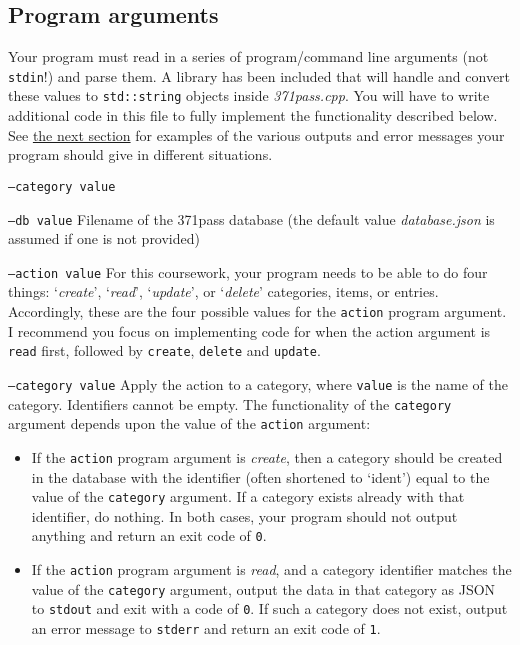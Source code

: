 \documentclass[a4paper]{article}
\begin{document}
\subsection*{Program arguments}\label{sec:cwk args}
Your program must read in a series of program/command line arguments (not \texttt{stdin}!) and parse them. A library has been included that will handle and convert these values to \texttt{std::string} objects inside \emph{371pass.cpp}. You will have to write additional code in this file to fully implement the functionality described below. See \hyperref[sec:cwk outputs]{the next section} for examples of the various outputs and error messages your program should give in different situations. 

\begin{labeling}{ \texttt{--category value} }
    \item[\texttt{--db value}]
    Filename of the 371pass database (the default value \emph{database.json} is assumed if one is not provided)

    \item[\texttt{--action value}]
    For this coursework, your program needs to be able to do four things: `\emph{create}', `\emph{read}', `\emph{update}', or `\emph{delete}' categories, items, or entries. Accordingly, these are the four possible values for the \texttt{action} program argument. I recommend you focus on implementing code for when the action argument is \texttt{read} first, followed by \texttt{create}, \texttt{delete} and \texttt{update}.

    \item[\texttt{--category value}]
    Apply the action to a category, where \texttt{value} is the name of the category. Identifiers cannot be empty. The functionality of the \texttt{category} argument depends upon the value of the \texttt{action} argument:
        \begin{itemize}
    
        \item If the \texttt{action} program argument is \emph{create}, then a category should be created in the database with the identifier (often shortened to `ident') equal to the value of the \texttt{category} argument. If a category exists already with that identifier, do nothing. In both cases, your program should not output anything and return an exit code of \texttt{0}.
    
        \item If the \texttt{action} program argument is \emph{read}, and a category identifier matches the value of the \texttt{category} argument, output the data in that category as JSON to \texttt{stdout} and exit with a code of \texttt{0}. If such a category does not exist, output an error message to \texttt{stderr} and return an exit code of \texttt{1}.
    

\end{itemize}
\end{labeling}
\end{document}
